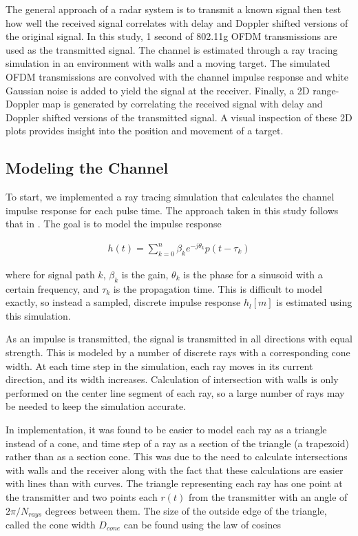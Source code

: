 \documentclass[article,11pt,onecolumn,final]{IEEEtran}
\begin{document}
The general approach of a radar system is to transmit a known signal then test how well the received signal correlates with delay and Doppler shifted versions of the original signal. In this study, 1 second of 802.11g OFDM transmissions are used as the transmitted signal. The channel is estimated through a ray tracing simulation in an environment with walls and a moving target. The simulated OFDM transmissions are convolved with the channel impulse response and white Gaussian noise is added to yield the signal at the receiver. Finally, a 2D range-Doppler map is generated by correlating the received signal with delay and Doppler shifted versions of the transmitted signal. A visual inspection of these 2D plots provides insight into the position and movement of a target.

\subsection{Modeling the Channel}

To start, we implemented a ray tracing simulation that calculates the channel impulse response for each pulse time. The approach taken in this study follows that in \cite{Holt}. The goal is to model the impulse response

\begin{align*}
 h(t) = \sum_{k=0}^{n} \beta_k e^{-j \theta_k} p(t - \tau_k) 
\end{align*}

where for signal path $k$, $\beta_k$ is the gain, $\theta_k$ is the phase for a sinusoid with a certain frequency, and $\tau_k$ is the propagation time. This is difficult to model exactly, so instead a sampled, discrete impulse response $h_l[m]$ is estimated using this simulation. 

As an impulse is transmitted, the signal is transmitted in all directions with equal strength. This is modeled by a number of discrete rays with a corresponding cone width. At each time step in the simulation, each ray moves in its current direction, and its width increases. Calculation of intersection with walls is only performed on the center line segment of each ray, so a large number of rays may be needed to keep the simulation accurate. 

In implementation, it was found to be easier to model each ray as a triangle instead of a cone, and time step of a ray as a section of the triangle (a trapezoid) rather than as a section cone. This was due to the need to calculate intersections with walls and the receiver along with the fact that these calculations are easier with lines than with curves. The triangle representing each ray has one point at the transmitter and two points each $r(t)$ from the transmitter with an angle of $2 \pi/N_{rays}$ degrees between them. The size of the outside edge of the triangle, called the cone width $D_{cone}$ can be found using the law of cosines
\end{document}
